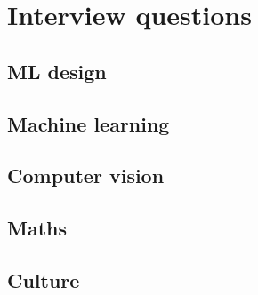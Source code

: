 \documentclass[../main.tex]{subfiles}
\begin{document}
\chapter{Interview questions}
\section{ML design}

\section{Machine learning}

\section{Computer vision}

\section{Maths}

\section{Culture}
\end{document}
